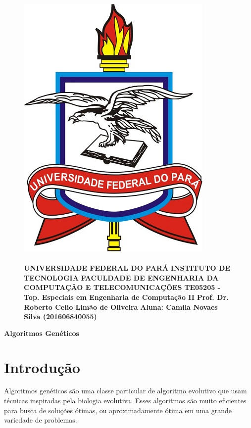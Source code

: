 \documentclass[12pt]{article}
\title{}
\date{}
\begin{document}
\begin{figure}
		\begin{minipage}{.3\linewidth}
			\centering
			\includegraphics[width=.6\linewidth]{imgs/ufpa.jpg}
		\end{minipage}
		\begin{minipage}{.70\linewidth}
			\flushleft
			\paragraph{}
			\textbf{ }\newline
			\textbf{UNIVERSIDADE FEDERAL DO PARÁ} \newline
			\textbf{INSTITUTO DE TECNOLOGIA} \newline
			\textbf{FACULDADE DE ENGENHARIA DA COMPUTAÇÃO E TELECOMUNICAÇÕES} \newline
			\textbf{TE05205 - Top. Especiais em Engenharia de Computação II} \newline
            \textbf{Prof. Dr. Roberto Celio Limão de Oliveira} \newline
            \textbf{Aluna: Camila Novaes Silva (201606840055)}
		\end{minipage}
\end{figure}
\FloatBarrier
\begin{center}
    {\Large \textbf{Algoritmos Genéticos}}
\end{center}

\section{Introdução}
Algoritmos genéticos são uma classe particular de algoritmo evolutivo que usam técnicas
inspiradas pela biologia evolutiva. Esses algoritmos são muito eficientes para busca de
soluções ótimas, ou aproximadamente ótima em uma grande variedade de problemas.
\end{document}
